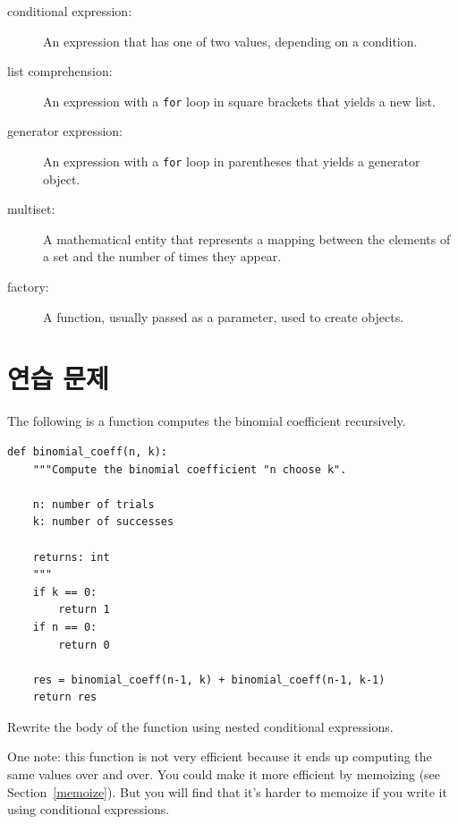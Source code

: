 \documentclass[10pt]{book}
\begin{document}
\begin{description}

\item[conditional expression:] An expression that has one of two
values, depending on a condition.

\item[list comprehension:] An expression with a {\tt for} loop in square
brackets that yields a new list.

\item[generator expression:] An expression with a {\tt for} loop in parentheses
that yields a generator object.  

\item[multiset:] A mathematical entity that represents a mapping
between the elements of a set and the number of times they appear.

\item[factory:] A function, usually passed as a parameter, used to
create objects. 

\end{description}




\section{연습 문제}

\begin{exercise}

The following is a function computes the binomial
coefficient recursively.

\begin{verbatim}
def binomial_coeff(n, k):
    """Compute the binomial coefficient "n choose k".

    n: number of trials
    k: number of successes

    returns: int
    """
    if k == 0:
        return 1
    if n == 0:
        return 0

    res = binomial_coeff(n-1, k) + binomial_coeff(n-1, k-1)
    return res
\end{verbatim}

Rewrite the body of the function using nested conditional
expressions.

One note: this function is not very efficient because it ends up computing
the same values over and over.  You could make it more efficient by
memoizing (see Section~\ref{memoize}).  But you will find that it's harder to
memoize if you write it using conditional expressions.

\end{exercise}
\end{document}

